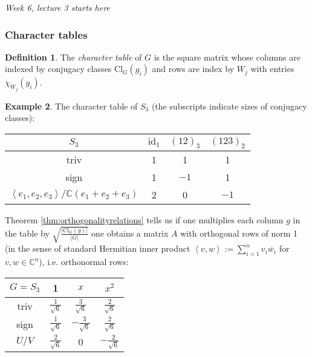 \documentclass[a4paper]{article}
\newcommand{\la}{\left\langle}
\newcommand{\ra}{\right\rangle}
\newcommand{\C}{\mathbb{C}}
\newcommand{\Cl}{\text{Cl}}
\newcommand{\id}{\text{id}}
\theoremstyle{definition}
\newtheorem{defn}{Definition}[subsection]
\newtheorem{example}[defn]{Example}
\begin{document}
\begin{flushright}
\textit{Week 6, lecture 3 starts here}
\end{flushright}

\subsubsection{Character tables}
\begin{defn}
The \textit{character table} of $G$ is the square matrix whose columns are indexed by conjugacy classes $\Cl_G(g_i)$ and rows are index by $W_j$ with entries $\chi_{W_j}(g_i)$.
\end{defn}
\begin{example}
The character table of $S_3$ (the subscripts indicate sizes of conjugacy classes):
\begin{table}[H]
\centering
\begin{tabular}{c|ccc}
$S_3$                              & $\id_1$ & $(12)_3$  & $(123)_2$ \\ \hline
triv                                 & 1 & 1    & 1     \\
sign                                 & 1 & $-1$ & 1     \\
$\la e_1,e_2,e_3\ra/\C(e_1+e_2+e_3)$ & 2 & 0    & $-1$ 
\end{tabular}
\end{table}

Theorem \ref{thm:orthogonalityrelations} tells us if one multiplies each column $g$ in the table by $\sqrt{\frac{|\Cl_G(g)|}{|G|}}$ one obtains a matrix $A$ with orthogonal rows of norm 1 (in the sense of standard Hermitian inner product $\la v,w\ra:=\sum_{i=1}^n v_i\overline{w_i}$ for $v,w\in\C^n$), i.e. orthonormal rows:

\begin{table}[H]
\centering
\begin{tabular}{c|ccc}
$G=S_3$                              & 1                   & $x$                  & $x^2$                \\ \hline
triv                                 & $\frac{1}{\sqrt 6}$ & $\frac{3}{\sqrt 6}$  & $\frac{2}{\sqrt 6}$  \\
sign                                 & $\frac{1}{\sqrt 6}$ & $-\frac{3}{\sqrt 6}$ & $\frac{2}{\sqrt 6}$  \\
$U/V$ & $\frac{2}{\sqrt 6}$ & 0                    & $-\frac{2}{\sqrt 6}$
\end{tabular}
\end{table}
\end{example}
\end{document}
